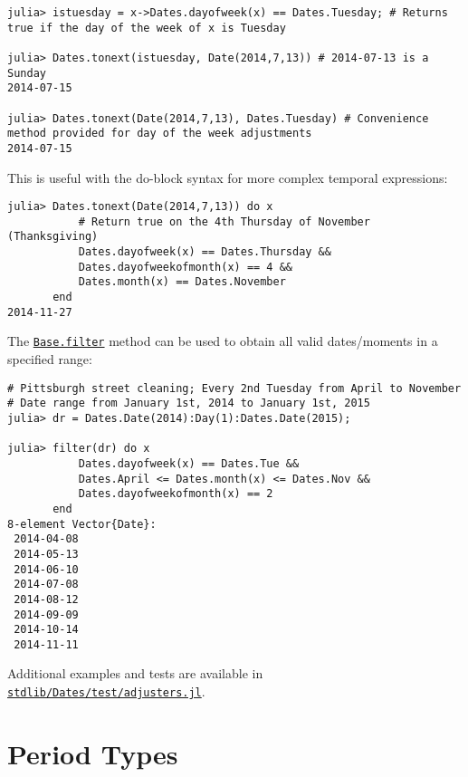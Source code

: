 \begin{verbatim}
julia> istuesday = x->Dates.dayofweek(x) == Dates.Tuesday; # Returns true if the day of the week of x is Tuesday

julia> Dates.tonext(istuesday, Date(2014,7,13)) # 2014-07-13 is a Sunday
2014-07-15

julia> Dates.tonext(Date(2014,7,13), Dates.Tuesday) # Convenience method provided for day of the week adjustments
2014-07-15
\end{verbatim}



This is useful with the do-block syntax for more complex temporal expressions:




\begin{verbatim}
julia> Dates.tonext(Date(2014,7,13)) do x
           # Return true on the 4th Thursday of November (Thanksgiving)
           Dates.dayofweek(x) == Dates.Thursday &&
           Dates.dayofweekofmonth(x) == 4 &&
           Dates.month(x) == Dates.November
       end
2014-11-27
\end{verbatim}



The \hyperlink{11445961893478569145}{\texttt{Base.filter}} method can be used to obtain all valid dates/moments in a specified range:




\begin{verbatim}
# Pittsburgh street cleaning; Every 2nd Tuesday from April to November
# Date range from January 1st, 2014 to January 1st, 2015
julia> dr = Dates.Date(2014):Day(1):Dates.Date(2015);

julia> filter(dr) do x
           Dates.dayofweek(x) == Dates.Tue &&
           Dates.April <= Dates.month(x) <= Dates.Nov &&
           Dates.dayofweekofmonth(x) == 2
       end
8-element Vector{Date}:
 2014-04-08
 2014-05-13
 2014-06-10
 2014-07-08
 2014-08-12
 2014-09-09
 2014-10-14
 2014-11-11
\end{verbatim}



Additional examples and tests are available in \href{https://github.com/JuliaLang/julia/blob/master/stdlib/Dates/test/adjusters.jl}{\texttt{stdlib/Dates/test/adjusters.jl}}.



\hypertarget{6665623146623573170}{}


\section{Period Types}




